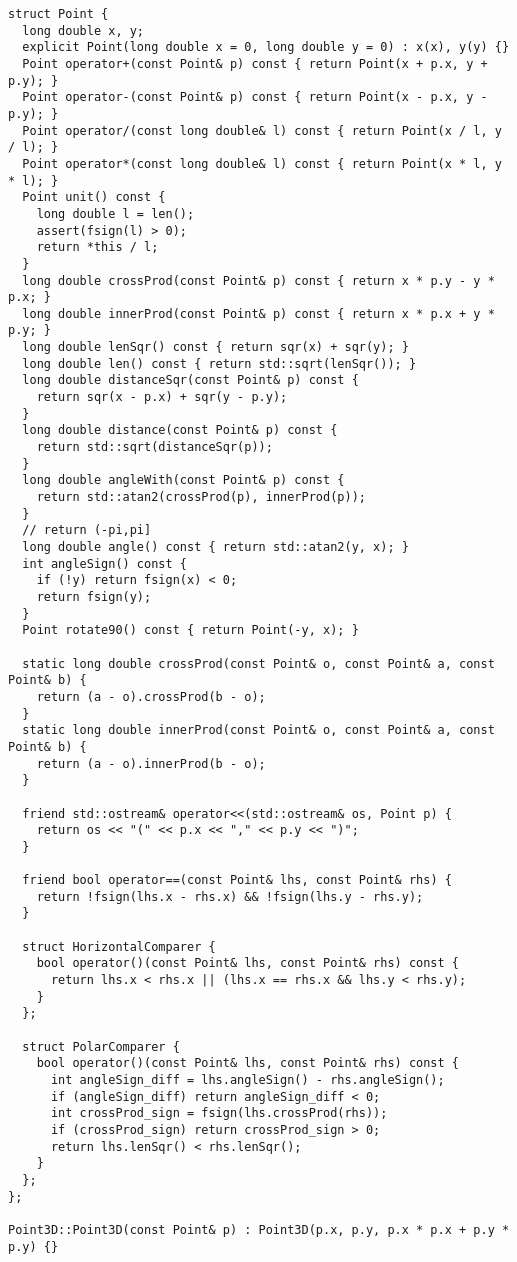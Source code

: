 \documentclass{article}
\begin{document}
\begin{multicols}{2}
\begin{lstlisting}
struct Point {
  long double x, y;
  explicit Point(long double x = 0, long double y = 0) : x(x), y(y) {}
  Point operator+(const Point& p) const { return Point(x + p.x, y + p.y); }
  Point operator-(const Point& p) const { return Point(x - p.x, y - p.y); }
  Point operator/(const long double& l) const { return Point(x / l, y / l); }
  Point operator*(const long double& l) const { return Point(x * l, y * l); }
  Point unit() const {
    long double l = len();
    assert(fsign(l) > 0);
    return *this / l;
  }
  long double crossProd(const Point& p) const { return x * p.y - y * p.x; }
  long double innerProd(const Point& p) const { return x * p.x + y * p.y; }
  long double lenSqr() const { return sqr(x) + sqr(y); }
  long double len() const { return std::sqrt(lenSqr()); }
  long double distanceSqr(const Point& p) const {
    return sqr(x - p.x) + sqr(y - p.y);
  }
  long double distance(const Point& p) const {
    return std::sqrt(distanceSqr(p));
  }
  long double angleWith(const Point& p) const {
    return std::atan2(crossProd(p), innerProd(p));
  }
  // return (-pi,pi]
  long double angle() const { return std::atan2(y, x); }
  int angleSign() const {
    if (!y) return fsign(x) < 0;
    return fsign(y);
  }
  Point rotate90() const { return Point(-y, x); }

  static long double crossProd(const Point& o, const Point& a, const Point& b) {
    return (a - o).crossProd(b - o);
  }
  static long double innerProd(const Point& o, const Point& a, const Point& b) {
    return (a - o).innerProd(b - o);
  }

  friend std::ostream& operator<<(std::ostream& os, Point p) {
    return os << "(" << p.x << "," << p.y << ")";
  }

  friend bool operator==(const Point& lhs, const Point& rhs) {
    return !fsign(lhs.x - rhs.x) && !fsign(lhs.y - rhs.y);
  }

  struct HorizontalComparer {
    bool operator()(const Point& lhs, const Point& rhs) const {
      return lhs.x < rhs.x || (lhs.x == rhs.x && lhs.y < rhs.y);
    }
  };

  struct PolarComparer {
    bool operator()(const Point& lhs, const Point& rhs) const {
      int angleSign_diff = lhs.angleSign() - rhs.angleSign();
      if (angleSign_diff) return angleSign_diff < 0;
      int crossProd_sign = fsign(lhs.crossProd(rhs));
      if (crossProd_sign) return crossProd_sign > 0;
      return lhs.lenSqr() < rhs.lenSqr();
    }
  };
};

Point3D::Point3D(const Point& p) : Point3D(p.x, p.y, p.x * p.x + p.y * p.y) {}


\end{lstlisting}
\end{multicols}
\end{document}
